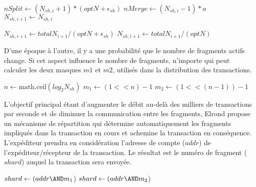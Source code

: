 \documentclass[journal]{IEEEtran}
\begin{document}
 \algnewcommand{}
    \algnewcommand{}
    \algnewcommand{}
    \newcommand{\func}{\textrm}

    \begin{algorithm}
        \begin{algorithmic}[1]
            \State $nSplit\gets (N_{sh,i}+1)*(optN + \epsilon_{sh})$
            \State $nMerge\gets (N_{sh,i}-1)*a$
            \State $N_{sh,i+1}\gets N_{sh,i}$

            	\State $N_{sh,i+1}\gets totalN_{i+1}/(optN + \epsilon_{sh})$
            	\State $N_{sh,i+1}\gets totalN_{i+1}/(optN)$
               \EndIf

            \State{}
            \EndFunction
        \end{algorithmic}
    \end{algorithm}


D'une époque à l'autre, il y a une probabilité que le nombre de fragments actifs change. Si cet aspect influence le nombre de fragments, n'importe qui peut calculer les deux masques $m1$ et $m2$, utilisés dans la distribution des transactions.

  \begin{algorithm}
    \begin{algorithmic}[1]
            \State $n\gets \func{math.ceil}(log_2N_{sh})$
            \State $m_1\gets (1<< n) -1$
            \State $m_2\gets (1 << (n-1)) -1$
            \State{}
        \EndFunction
    \end{algorithmic}
    \end{algorithm}


L'objectif principal étant d'augmenter le débit au-delà des milliers de transactions par seconde et de diminuer la communication entre les fragments, Elrond propose un mécanisme de répartition qui détermine automatiquement les fragments impliqués dans la transaction en cours et achemine la transaction en conséquence. L'expéditeur prendra en considération l'adresse de compte ($addr$) de l'expéditeur/récepteur de la transaction. Le résultat est le numéro de fragment ($shard$) auquel la transaction sera envoyée.

  \begin{algorithm}
    \begin{algorithmic}[1]
            \State $shard\gets (addr \AND m_1$)
            \State $shard \gets (addr \AND m_2$)
            \EndIf

            \State{}
        \EndFunction
    \end{algorithmic}
    \end{algorithm}
\end{document}
